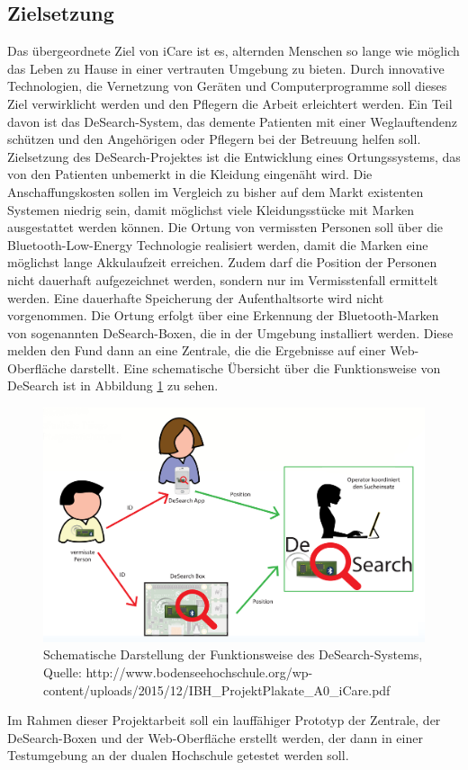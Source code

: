 \subsection{Zielsetzung}
Das übergeordnete Ziel von iCare ist es, alternden Menschen so lange wie möglich das Leben zu Hause in einer vertrauten Umgebung zu bieten. Durch innovative Technologien, die Vernetzung von Geräten und Computerprogramme soll dieses Ziel verwirklicht werden und den Pflegern die Arbeit erleichtert werden. Ein Teil davon ist das DeSearch-System, das demente Patienten mit einer Weglauftendenz schützen und den Angehörigen oder Pflegern bei der Betreuung helfen soll.
Zielsetzung des DeSearch-Projektes ist die Entwicklung eines Ortungssystems, das von den Patienten unbemerkt in die Kleidung eingenäht wird. Die Anschaffungskosten sollen im Vergleich zu bisher auf dem Markt existenten Systemen niedrig sein, damit möglichst viele Kleidungsstücke mit Marken ausgestattet werden können. Die Ortung von vermissten Personen soll über die Bluetooth-Low-Energy Technologie realisiert werden, damit die Marken eine möglichst lange Akkulaufzeit erreichen. Zudem darf die Position der Personen nicht dauerhaft aufgezeichnet werden, sondern nur im Vermisstenfall ermittelt werden. Eine dauerhafte Speicherung der Aufenthaltsorte wird nicht vorgenommen. Die Ortung erfolgt über eine Erkennung der Bluetooth-Marken von sogenannten DeSearch-Boxen, die in der Umgebung installiert werden. Diese melden den Fund dann an eine Zentrale, die die Ergebnisse auf einer Web-Oberfläche darstellt. Eine schematische Übersicht über die Funktionsweise von DeSearch ist in Abbildung \ref{fig:desearch} zu sehen. 
\begin{figure}
	\centering
	\includegraphics[width=\textwidth]{images/iCare-Systematik}
	\caption[Funktionsweise des DeSearch-Systems]{Schematische Darstellung der Funktionsweise des DeSearch-Systems, Quelle: http://www.bodenseehochschule.org/wp-content/uploads/2015/12/IBH\_ProjektPlakate\_A0\_iCare.pdf }
	\label{fig:desearch}
\end{figure} 
Im Rahmen dieser Projektarbeit soll ein lauffähiger Prototyp der Zentrale, der DeSearch-Boxen und der Web-Oberfläche erstellt werden, der dann in einer Testumgebung an der dualen Hochschule getestet werden soll.
